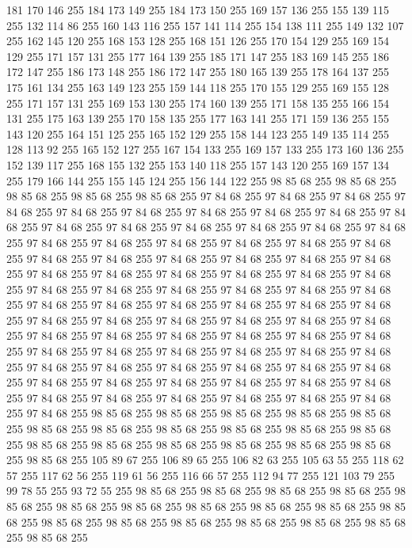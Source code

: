 181 170 146 255 184 173 149 255 184 173 150 255 169 157 136 255 155 139 115 255 132 114 86 255 160 143 116 255 157 141 114 255 154 138 111 255 149 132 107 255 162 145 120 255 168 153 128 255 168 151 126 255 170 154 129 255 169 154 129 255 171 157 131 255 177 164 139 255 185 171 147 255 183 169 145 255 186 172 147 255 186 173 148 255 186 172 147 255 180 165 139 255 178 164 137 255 175 161 134 255 163 149 123 255 159 144 118 255 170 155 129 255 169 155 128 255 171 157 131 255 169 153 130 255 174 160 139 255 171 158 135 255 166 154 131 255 175 163 139 255 170 158 135 255 177 163 141 255 171 159 136 255 155 143 120 255 164 151 125 255 165 152 129 255 158 144 123 255 149 135 114 255 128 113 92 255 165 152 127 255 167 154 133 255 169 157 133 255 173 160 136 255 152 139 117 255 168 155 132 255 153 140 118 255 157 143 120 255 169 157 134 255 179 166 144 255 155 145 124 255 156 144 122 255 98 85 68 255 98 85 68 255 98 85 68 255 98 85 68 255 98 85 68 255 97 84 68 255 97 84 68 255 97 84 68 255
97 84 68 255 97 84 68 255 97 84 68 255 97 84 68 255 97 84 68 255 97 84 68 255 97 84 68 255 97 84 68 255 97 84 68 255 97 84 68 255 97 84 68 255 97 84 68 255 97 84 68 255 97 84 68 255 97 84 68 255 97 84 68 255 97 84 68 255 97 84 68 255 97 84 68 255 97 84 68 255 97 84 68 255 97 84 68 255 97 84 68 255 97 84 68 255 97 84 68 255 97 84 68 255 97 84 68 255 97 84 68 255 97 84 68 255 97 84 68 255 97 84 68 255 97 84 68 255 97 84 68 255 97 84 68 255 97 84 68 255 97 84 68 255 97 84 68 255 97 84 68 255 97 84 68 255 97 84 68 255 97 84 68 255 97 84 68 255 97 84 68 255 97 84 68 255 97 84 68 255 97 84 68 255 97 84 68 255 97 84 68 255 97 84 68 255 97 84 68 255 97 84 68 255 97 84 68 255 97 84 68 255 97 84 68 255 97 84 68 255 97 84 68 255 97 84 68 255 97 84 68 255 97 84 68 255 97 84 68 255 97 84 68 255 97 84 68 255 97 84 68 255 97 84 68 255
97 84 68 255 97 84 68 255 97 84 68 255 97 84 68 255 97 84 68 255 97 84 68 255 97 84 68 255 97 84 68 255 97 84 68 255 97 84 68 255 97 84 68 255 97 84 68 255 97 84 68 255 97 84 68 255 97 84 68 255 97 84 68 255 98 85 68 255 98 85 68 255 98 85 68 255 98 85 68 255 98 85 68 255 98 85 68 255 98 85 68 255 98 85 68 255 98 85 68 255 98 85 68 255 98 85 68 255 98 85 68 255 98 85 68 255 98 85 68 255 98 85 68 255 98 85 68 255 98 85 68 255 98 85 68 255 105 89 67 255 106 89 65 255 106 82 63 255 105 63 55 255 118 62 57 255 117 62 56 255 119 61 56 255 116 66 57 255 112 94 77 255 121 103 79 255 99 78 55 255 93 72 55 255 98 85 68 255 98 85 68 255 98 85 68 255 98 85 68 255 98 85 68 255 98 85 68 255 98 85 68 255 98 85 68 255 98 85 68 255 98 85 68 255 98 85 68 255 98 85 68 255 98 85 68 255 98 85 68 255 98 85 68 255 98 85 68 255 98 85 68 255 98 85 68 255
